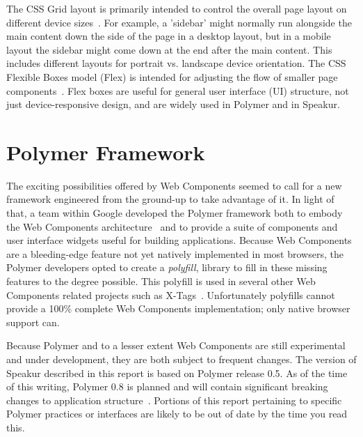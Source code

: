 The CSS Grid layout is primarily intended to control the overall page layout on different device sizes~\cite{w3ccontributors2015-d}.
For example, a 'sidebar' might normally run alongside the main content down the side of the page in a desktop layout, but in a mobile layout the sidebar might come down at the end after the main content.
This includes different layouts for portrait vs. landscape device orientation.
The CSS Flexible Boxes model (Flex) is intended for adjusting the flow of smaller page components~\cite{mozillacontributors2015}.
Flex boxes are useful for general user interface (UI) structure, not just device-responsive design, and are widely used in Polymer and in Speakur.

\section{Polymer Framework}

The exciting possibilities offered by Web Components seemed to call for a new framework engineered from the ground-up to take advantage of it.
In light of that, a team within Google developed the 
Polymer framework both to embody the Web Components 
architecture~\cite{polymercontributors2015} and 
to provide a suite of components and user interface widgets useful for building applications.
Because Web Components are a bleeding-edge feature not yet natively implemented in most browsers,
the Polymer developers opted to create a \textit{polyfill}, 
library to fill in these missing features to the degree possible.
This polyfill is used in several other Web Components related projects such as 
X-Tags~\cite{x-tagscontributors2015}.
Unfortunately polyfills cannot provide a 100\% complete Web Components implementation; 
only native browser support can.

Because Polymer and to a lesser extent Web Components are still experimental and under development, 
they are both subject to frequent changes.
The version of Speakur described in this report is based on Polymer release 0.5.
As of the time of this writing, Polymer 0.8 is planned and will contain significant breaking changes to application structure~\cite{michaelbleigh2015}.
Portions of this report pertaining to specific Polymer practices or interfaces are likely to be out of date by the time you read this.

